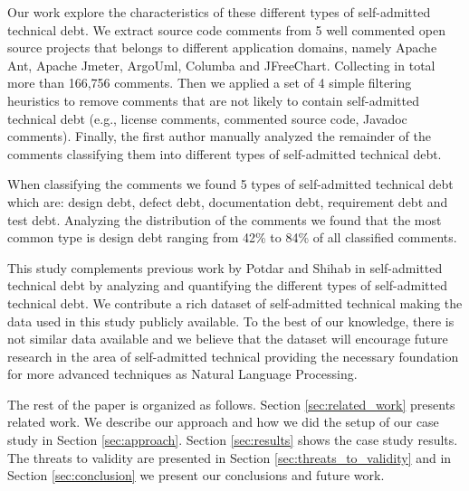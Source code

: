 Our work explore the characteristics of these different types of self-admitted technical debt. We extract source code comments from 5 well commented open source projects that belongs to different application domains, namely Apache Ant, Apache Jmeter, ArgoUml, Columba and JFreeChart. Collecting in total more than 166,756 comments. Then we applied a set of 4 simple filtering heuristics to remove comments that are not likely to contain self-admitted technical debt (e.g., license comments, commented source code, Javadoc comments). Finally, the first author manually analyzed the remainder of the comments classifying them into different types of self-admitted technical debt. 

When classifying the comments we found 5 types of self-admitted technical debt which are: design debt, defect debt, documentation debt, requirement debt and test debt. Analyzing the distribution of the comments we found that the most common type is design debt ranging from 42\% to 84\% of all classified comments. 

This study complements previous work by Potdar and Shihab \cite{Potdar2014ICSME} in self-admitted technical debt by analyzing and quantifying the different types of self-admitted technical debt. We contribute a rich dataset of self-admitted technical making the data used in this study publicly available. To the best of our knowledge, there is not similar data available and we believe that the dataset will encourage future research in the area of self-admitted technical providing the necessary foundation for more advanced techniques as Natural Language Processing.  

The rest of the paper is organized as follows. Section \ref{sec:related_work} presents related work. We describe our approach and how we did the setup of our case study in Section \ref{sec:approach}. Section \ref{sec:results} shows the case study results. The threats to validity are presented in Section \ref{sec:threats_to_validity} and in Section \ref{sec:conclusion} we present our conclusions and future work. 
